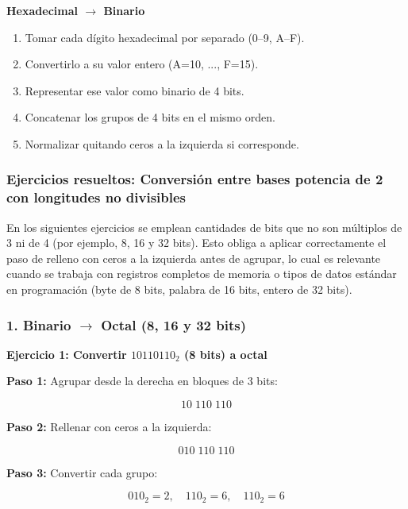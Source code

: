 \documentclass[12pt,twoside]{book}
\begin{document}
						\textbf{Hexadecimal $\rightarrow$ Binario}
						\begin{enumerate}
							\item Tomar cada dígito hexadecimal por separado (0--9, A--F).
							\item Convertirlo a su valor entero (A=10, ..., F=15).
							\item Representar ese valor como binario de 4 bits.
							\item Concatenar los grupos de 4 bits en el mismo orden.
							\item Normalizar quitando ceros a la izquierda si corresponde.
						\end{enumerate}
						
						\subsubsection*{Ejercicios resueltos: Conversión entre bases potencia de 2 con longitudes no divisibles}
						
						\noindent
						En los siguientes ejercicios se emplean cantidades de bits que no son múltiplos de 3 ni de 4 (por ejemplo, 8, 16 y 32 bits). Esto obliga a aplicar correctamente el paso de relleno con ceros a la izquierda antes de agrupar, lo cual es relevante cuando se trabaja con registros completos de memoria o tipos de datos estándar en programación (byte de 8 bits, palabra de 16 bits, entero de 32 bits).
						
						\subsubsection*{1. Binario $\rightarrow$ Octal (8, 16 y 32 bits)}
						
						\noindent
						\textbf{Ejercicio 1: Convertir $10110110_2$ (8 bits) a octal}
						
						\noindent
						\textbf{Paso 1:} Agrupar desde la derecha en bloques de 3 bits:
						
						\[
						10\;110\;110
						\]
						
						\noindent
						\textbf{Paso 2:} Rellenar con ceros a la izquierda:
						
						\[
						010\;110\;110
						\]
						
						\noindent
						\textbf{Paso 3:} Convertir cada grupo:
						
						\[
						010_2=2,\quad 110_2=6,\quad 110_2=6
						\]
						
\end{document}
